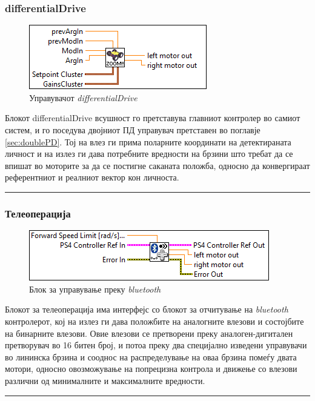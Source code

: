 \documentclass[12pt]{article}
\begin{document}
    \subsubsection{differentialDrive}
	    \begin{figure}[H]
	      \includegraphics[width=0.55\linewidth]{./images/differential_drive_border.png}
		    \caption{Управувачот \textit{differentialDrive}}
	      \label{fig:diffDrive}
	      \raggedright
	      \end{figure}
      Блокот differentialDrive всушност го претставува главниот контролер во самиот систем, и го поседува двојниот ПД управувач претставен во поглавје \ref{sec:doublePD}. Тој на влез ги прима поларните координати на детектираната личност и на излез ги дава потребните вредности на брзини што требат да се впишат во моторите за да се постигне саканата положба, односно да конвергираат референтниот и реалниот вектор кон личноста.
      \\
      \textcolor[RGB]{150,150,150}{\rule{\linewidth}{1.6pt}}

    \subsubsection{Телеоперација}
	    \begin{figure}[H]
	      \includegraphics[width=0.55\linewidth]{./images/teleop_tooltip_border.png}
		    \caption{Блок за управување преку \textit{bluetooth}}
	      \label{fig:teleop}
	      \raggedright
	      \end{figure}
	    Блокот за телеоперација има интерфејс со блокот за отчитување на \textit{bluetooth} контролерот, кој на излез ги дава положбите на аналогните влезови и состојбите на бинарните влезови. Овие влезови се претворени преку аналоген-дигитален претворувач во 16 битен број, и потоа преку два специјално изведени управувачи во лининска брзина и сооднос на распределување на оваа брзина помеѓу двата мотори, односно овозможување на попрецизна контрола и движење со влезови различни од минималните и максималните вредности.\\
      \textcolor[RGB]{150,150,150}{\rule{\linewidth}{1.6pt}}
\end{document}
